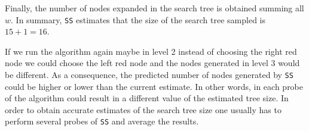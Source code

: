 Finally, the number of nodes expanded in the search tree is obtained summing all $w$. In summary, \texttt{SS} estimates that the size of the search tree sampled is $15 + 1 = 16$. 

If we run the algorithm again maybe in level 2 instead of choosing the right red node we could choose the left red node and the nodes generated in level 3 would be different. As a consequence, the predicted number of nodes generated by \texttt{SS} could be higher or lower than the current estimate. In other words, in each probe of the algorithm could result in a different value of the estimated tree size. In order to obtain accurate estimates of the search tree size one usually has to perform several probes of \texttt{SS} and average the results.
